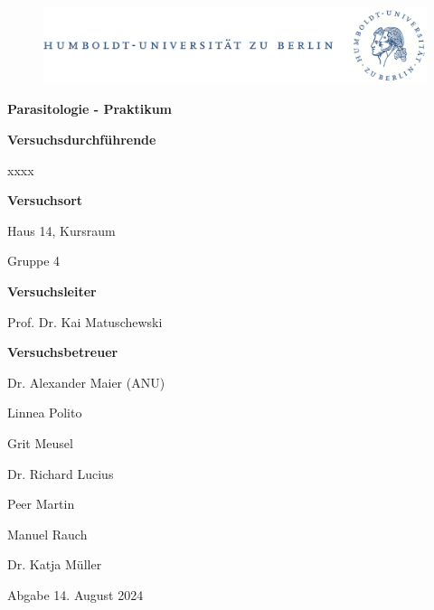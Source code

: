 \documentclass[oneside,10pt,a4paper]{report}
\begin{document}
	
	\begin{titlepage}
		\begin{center}
			\begin{figure}[h!tbp]
				\includegraphics[width=\linewidth]{HUlogo.PNG}
			\end{figure}
			\vspace*{2 cm}
			
			\textcolor{Bluetitle}{\textbf{\huge Parasitologie - Praktikum}}\par
			
			\vspace*{2cm}
			\textcolor{Greyish}{\textbf{Versuchsdurchführende}}\par
			\textcolor{Greyish}{xxxx}\par

			\vspace*{0.5cm}
			\textcolor{Greyish}{\textbf{Versuchsort}}\par
			\textcolor{Greyish}{Haus 14, Kursraum}\par
			\textcolor{Greyish}{Gruppe 4}\par

			
			\vspace*{2 cm}
			\textcolor{Greyish}{\textbf{Versuchsleiter}}\par
			\textcolor{Greyish}{Prof. Dr. Kai Matuschewski}\par
			\vspace*{0.5cm}
			\textcolor{Greyish}{\textbf{Versuchsbetreuer}}\par
			\textcolor{Greyish}{Dr. Alexander Maier (ANU)}\par
			\textcolor{Greyish}{Linnea Polito}\par
			\textcolor{Greyish}{Grit Meusel}\par
			\textcolor{Greyish}{Dr. Richard Lucius}\par
			\textcolor{Greyish}{Peer Martin}\par
			\textcolor{Greyish}{Manuel Rauch}\par
			\textcolor{Greyish}{Dr. Katja Müller}\par

			\vspace*{2 cm}
			\textcolor{Greyish}{Abgabe 14. August 2024}\par
			
			
			
		\end{center}
	\end{titlepage}
\end{document}
